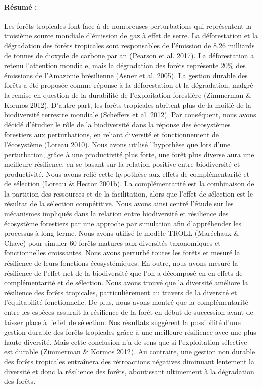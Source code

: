 \documentclass[12pt,]{article}
\theoremstyle{definition}
\theoremstyle{definition}
\theoremstyle{remark}
\begin{document}
  \newpage
  \scriptsize{
  \paragraph{Résumé :}
  Les forêts tropicales font face à de nombreuses perturbations qui représentent la troisième source mondiale d’émission de gaz à effet de serre. La déforestation et la dégradation des forêts tropicales sont responsables de l’émission de 8.26 milliards de tonnes de dioxyde de carbone par an (Pearson et al. 2017). La déforestation a retenu l’attention mondiale, mais la dégradation des forêts représente 20\% des émissions de l’Amazonie brésilienne (Asner et al. 2005). La gestion durable des forêts a été proposée comme réponse à la déforestation et la dégradation, malgré la remise en question de la durabilité de l’exploitation forestière (Zimmerman \& Kormos 2012). D’autre part, les forêts tropicales abritent plus de la moitié de la biodiversité terrestre mondiale (Scheffers et al. 2012). Par conséquent, nous avons décidé d’étudier le rôle de la biodiversité dans la réponse des écosystèmes forestiers aux perturbations, en reliant diversité et fonctionnement de l’écosystème (Loreau 2010). Nous avons utilisé l’hypothèse que lors d’une perturbation, grâce à une productivité plus forte, une forêt plus diverse aura une meilleure résilience, en se basant sur la relation positive entre biodiversité et productivité. Nous avons relié cette hypothèse aux effets de complémentarité et de sélection (Loreau \& Hector 2001b). La complémentarité est la combinaison de la partition des ressources et de la facilitation, alors que l’effet de sélection est le résultat de la sélection compétitive. Nous avons ainsi centré l’étude sur les mécanismes impliqués dans la relation entre biodiversité et résilience des écosystème forestiers par une approche par simulation afin d’appréhender les processus à long terme. Nous avons utilisé le modèle TROLL (Maréchaux \& Chave) pour simuler 60 forêts matures aux diversités taxonomiques et fonctionnelles croissantes. Nous avons perturbé toutes les forêts et mesuré la résilience de leurs fonctions écosystémiques. En outre, nous avons mesuré la résilience de l’effet net de la biodiversité que l’on a décomposé en en effets de complémentarité et de sélection. Nous avons trouvé que la diversité améliore la résilience des forêts tropicales, particulièrement au travers de la diversité et l’équitabilité fonctionnelle. De plus, nous avons montré que la complémentarité entre les espèces assurait la résilience de la forêt en début de succession avant de laisser place à l’effet de sélection. Nos résultats suggèrent la possibilité d’une gestion durable des forêts tropicales grâce à une meilleure résilience avec une plus haute diversité. Mais cette conclusion n’a de sens que si l’exploitation sélective est durable (Zimmerman \& Kormos 2012). Au contraire, une gestion non durable des forêts tropicales entraînera des rétroactions négatives diminuant lentement la diversité et donc la résilience des forêts, aboutissant ultimement à la dégradation des forêts.
}
\end{document}
